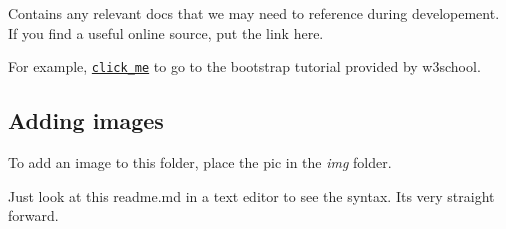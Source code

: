 Contains any relevant docs that we may need to reference during developement. If you find a useful online source, put the link here.

For example, \href{http://www.w3schools.com/bootstrap/}{\tt click\-\_\-me} to go to the bootstrap tutorial provided by w3school.

\subsection*{Adding images}

To add an image to this folder, place the pic in the {\itshape img} folder.



Just look at this readme.\-md in a text editor to see the syntax. Its very straight forward. 